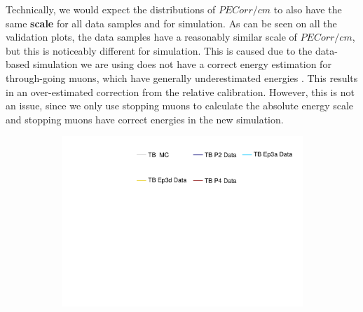 Technically, we would expect the distributions of $PECorr/cm$ to also have the same \textbf{scale} for all data samples and for simulation. As can be seen on all the validation plots, the data samples have a reasonably similar scale of $PECorr/cm$, but this is noticeably different for simulation. This is caused due to the data-based simulation we are using does not have a correct energy estimation for through-going muons, which have generally underestimated energies \cite{NOVA-doc-60026}. This results in an over-estimated correction from the relative calibration. However, this is not an issue, since we only use stopping muons to calculate the absolute energy scale and stopping muons have correct energies in the new simulation.

\begin{figure}[!ht]
  \begin{subfigure}{\textwidth}
  \centering
    \includegraphics[height=0.2\linewidth]{essentialsec_tb/legend.pdf}
  \end{subfigure}
  \vspace*{2mm}
  

\end{figure}
